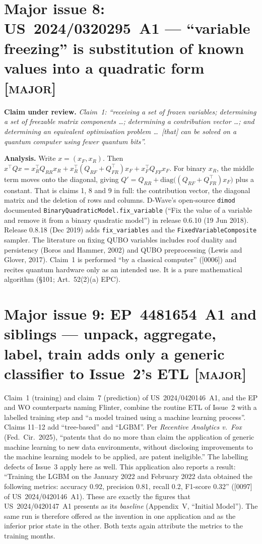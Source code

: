 \documentclass[10pt,a4paper]{article}
\newcommand{\claim}[1]{\noindent\textbf{Claim under review.} \emph{#1}\par\smallskip}
\newcommand{\sev}[1]{\textsc{\color{BrickRed}[#1]}}
\begin{document}
\section{Major issue 8: US~2024/0320295~A1 --- ``variable freezing'' is substitution of known values into a quadratic form \sev{major}}\label{sec:freeze}
\claim{Claim~1: ``receiving a set of frozen variables; determining a set of freezable matrix components \ldots; determining a contribution vector \ldots; and determining an equivalent optimisation problem \ldots\ [that] can be solved on a quantum computer using fewer quantum bits''.}

\noindent\textbf{Analysis.} Write $x=(x_F,x_R)$. Then $x^{\top}Qx=x_R^{\top}Q_{RR}x_R+x_R^{\top}(Q_{RF}+Q_{FR}^{\top})x_F+x_F^{\top}Q_{FF}x_F$. For binary $x_R$, the middle term moves onto the diagonal, giving $Q'=Q_{RR}+\mathrm{diag}\big((Q_{RF}+Q_{FR}^{\top})x_F\big)$ plus a constant. That is claims 1, 8 and 9 in full: the contribution vector, the diagonal matrix and the deletion of rows and columns. D-Wave's open-source \texttt{dimod} documented \texttt{BinaryQuadraticModel.fix\_variable} (``Fix the value of a variable and remove it from a binary quadratic model'') in release 0.6.10 (19 Jun 2018). Release 0.8.18 (Dec 2019) adds \texttt{fix\_variables} and the \texttt{FixedVariableComposite} sampler. The literature on fixing QUBO variables includes roof duality and persistency (Boros and Hammer, 2002) and QUBO preprocessing (Lewis and Glover, 2017). Claim~1 is performed ``by a classical computer'' ([0006]) and recites quantum hardware only as an intended use. It is a pure mathematical algorithm (\S101; Art.~52(2)(a) EPC).

\section{Major issue 9: EP~4481654~A1 and siblings --- unpack, aggregate, label, train adds only a generic classifier to Issue~2's ETL \sev{major}}\label{sec:pft}
Claim~1 (training) and claim~7 (prediction) of US~2024/0420146~A1, and the EP and WO counterparts naming Flinter, combine the routine ETL of Issue~2 with a labelled training step and ``a model trained using a machine learning process''. Claims 11--12 add ``tree-based'' and ``LGBM''. Per \emph{Recentive Analytics v.\ Fox} (Fed.\ Cir.\ 2025), ``patents that do no more than claim the application of generic machine learning to new data environments, without disclosing improvements to the machine learning models to be applied, are patent ineligible.'' The labelling defects of Issue~3 apply here as well. This application also reports a result: ``Training the LGBM on the January 2022 and February 2022 data obtained the following metrics: accuracy 0.92, precision 0.81, recall 0.2, F1-score 0.32'' ([0097] of US~2024/0420146~A1). These are exactly the figures that US~2024/0420147~A1 presents as its \emph{baseline} (Appendix~V, ``Initial Model''). The same run is therefore offered as the invention in one application and as the inferior prior state in the other. Both texts again attribute the metrics to the training months.
\end{document}
